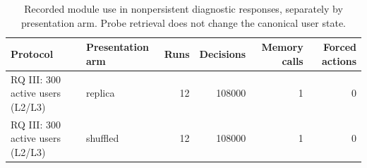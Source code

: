 \begin{table}[htbp!]
\centering
\small
\setlength{\tabcolsep}{3pt}
\renewcommand{\arraystretch}{1.1}
\begin{tabular}{llrrrr}
\hline
Protocol & Presentation arm & Runs & Decisions & Memory calls & Forced actions \\
\hline
RQ III: 300 active users (L2/L3) & replica & 12 & 108000 & 1 & 0 \\
RQ III: 300 active users (L2/L3) & shuffled & 12 & 108000 & 1 & 0 \\
\hline
\end{tabular}
\caption{Recorded module use in nonpersistent diagnostic responses, separately by presentation arm. Probe retrieval does not change the canonical user state.}
\label{chap:results:tab:rq3_probe_memory_forced_actions}
\end{table}
